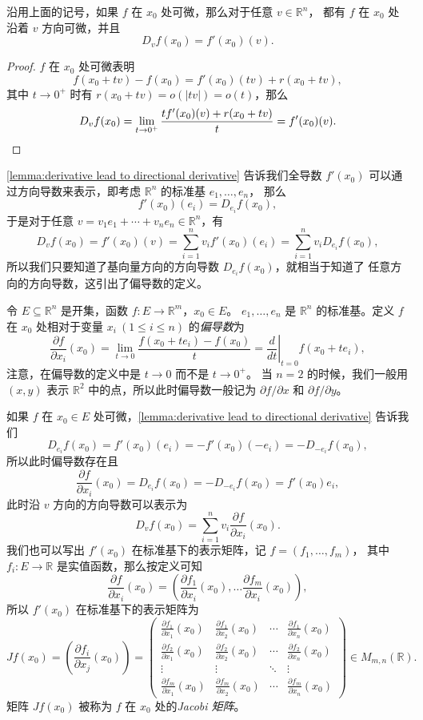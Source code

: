 \documentclass[fontset=none,zihao=-4]{Notes}
\newcommand{\abs}[1]{\left\lvert#1\right\rvert}
\begin{document}
\begin{lemma}\label{lemma:derivative lead to directional derivative}
  沿用上面的记号，如果 $f$ 在 $x_0$ 处可微，那么对于任意 $v\in\mathbb{R}^n$，
  都有 $f$ 在 $x_0$ 处沿着 $v$ 方向可微，并且
  \[
    D_vf(x_0)=f'(x_0)(v).  
  \]
\end{lemma}
\begin{proof}
  $f$ 在 $x_0$ 处可微表明
  \[
    f(x_0+tv)-f(x_0)=f'(x_0)(tv)+r(x_0+tv),  
  \]
  其中 $t\to 0^+$ 时有 $r(x_0+tv)=o(\abs{tv})=o(t)$，那么
  \[
    D_vf(x_0)=  \lim_{t\to 0^+}\frac{tf'(x_0)(v)+r(x_0+tv)}{t}
    =f'(x_0)(v).\qedhere
  \]
\end{proof}

\autoref{lemma:derivative lead to directional derivative} 告诉我们全导数
$f'(x_0)$ 可以通过方向导数来表示，即考虑 $\mathbb{R}^n$ 的标准基 $e_1,\dots,e_n$，
那么
\[
  f'(x_0)(e_i)=D_{e_i}f(x_0),  
\]
于是对于任意 $v=v_1e_1+\cdots+v_ne_n\in\mathbb{R}^n$，有
\[
  D_vf(x_0)=f'(x_0)(v)=\sum_{i=1}^n v_if'(x_0)(e_i)=\sum_{i=1}^nv_i D_{e_i}f(x_0),  
\]
所以我们只要知道了基向量方向的方向导数 $D_{e_i}f(x_0)$，就相当于知道了
任意方向的方向导数，这引出了偏导数的定义。

令 $E\subseteq\mathbb{R}^n$ 是开集，函数 $f:E\to\mathbb{R}^m$，$x_0\in E$。
$e_1,\dots,e_n$ 是 $\mathbb{R}^n$ 的标准基。定义 $f$ 在 $x_0$
处相对于变量 $x_i\ (1\leq i\leq n)$ 的\emph{偏导数}为
\[
  \frac{\partial f}{\partial x_i}(x_0)=\lim_{t\to 0}\frac{f(x_0+te_i)-f(x_0)}{t}=
  \left.\frac{d}{dt}\right|_{t=0}f(x_0+te_i),
\]
注意，在偏导数的定义中是 $t\to 0$ 而不是 $t\to 0^+$。
当 $n=2$ 的时候，我们一般用 $(x,y)$ 表示 $\mathbb{R}^2$
中的点，所以此时偏导数一般记为 $\partial f/\partial  x$ 和 $\partial f/\partial y$。

如果 $f$ 在 $x_0\in E$ 处可微，\autoref{lemma:derivative lead to directional derivative}
告诉我们
\[
  D_{e_i}f(x_0)=f'(x_0)(e_i)=-f'(x_0)(-e_i)=-D_{-e_i}f(x_0),
\]
所以此时偏导数存在且
\[
  \frac{\partial f}{\partial x_i}(x_0)=D_{e_i}f(x_0)=-D_{-e_i}f(x_0)
  =f'(x_0)e_i,
\]
此时沿 $v$ 方向的方向导数可以表示为
\[
  D_vf(x_0)=\sum_{i=1}^n v_i\frac{\partial f}{\partial x_i}(x_0).
\]
我们也可以写出 $f'(x_0)$ 在标准基下的表示矩阵，记 $f=(f_1,\dots,f_m)$，
其中 $f_i:E\to\mathbb{R}$ 是实值函数，那么按定义可知
\[
  \frac{\partial f}{\partial x_i}(x_0)=\left(
    \frac{\partial f_1}{\partial x_i}(x_0),\dots
    \frac{\partial f_m}{\partial x_i}(x_0)
  \right),
\]
所以 $f'(x_0)$ 在标准基下的表示矩阵为
\[
  Jf(x_0)=\left(\frac{\partial f_i}{\partial x_j}(x_0)\right)=\begin{pmatrix}
    \frac{\partial f_1}{\partial x_1}(x_0) &
    \frac{\partial f_1}{\partial x_2}(x_0) & \cdots &
    \frac{\partial f_1}{\partial x_n}(x_0) \\[2mm]
    \frac{\partial f_2}{\partial x_1}(x_0) &
    \frac{\partial f_2}{\partial x_2}(x_0) & \cdots &
    \frac{\partial f_2}{\partial x_n}(x_0) \\[2mm]
    \vdots & \vdots & \ddots & \vdots \\[2mm]
    \frac{\partial f_m}{\partial x_1}(x_0) &
    \frac{\partial f_m}{\partial x_2}(x_0) & \cdots &
    \frac{\partial f_m}{\partial x_n}(x_0) 
  \end{pmatrix}  \in M_{m,n}(\mathbb{R}).
\]
矩阵 $Jf(x_0)$ 被称为 $f$ 在 $x_0$ 处的\emph{Jacobi 矩阵}。
\end{document}
